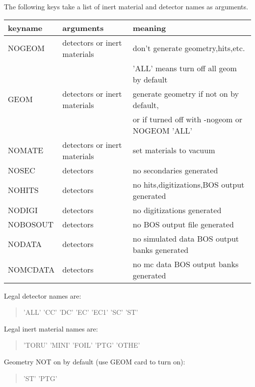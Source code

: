 \documentclass{article}
\begin{document}
\par
\noindent
The following keys take a list of inert material and detector names as arguments.
\par
\begin{center}
\begin{tabular}{|l|l|l|} \hline
keyname   &  arguments                    &  meaning \\ \hline
NOGEOM    &  detectors or inert materials &  don't generate geometry,hits,etc. \\
          &                               &  'ALL' means turn off all geom by default \\ \hline
GEOM      &  detectors or inert materials &  generate geometry if not on by default, \\
          &                               &  or if turned off with -nogeom or NOGEOM 'ALL' \\  \hline
NOMATE    &  detectors or inert materials &  set materials to vacuum \\ \hline
NOSEC     &  detectors                    &  no secondaries generated \\  \hline
NOHITS    &  detectors                    &  no hits,digitizations,BOS output generated \\  \hline
NODIGI    &  detectors                    &  no digitizations generated \\  \hline
NOBOSOUT  &  detectors                    &  no BOS output file generated \\  \hline
NODATA    &  detectors                    &  no simulated data BOS output banks generated \\  \hline
NOMCDATA  &  detectors                    &  no mc data BOS output banks generated \\ \hline
\end{tabular}
\end{center}
\par

\noindent
Legal detector names are:
\begin{quote}
'ALL' 'CC' 'DC' 'EC' 'EC1' 'SC' 'ST'
\end{quote}

\noindent
Legal inert material names are:
\begin{quote}
'TORU' 'MINI' 'FOIL' 'PTG' 'OTHE'
\end{quote}

\noindent
Geometry NOT on by default (use GEOM card to turn on):
\begin{quote}
'ST' 'PTG'
\end{quote}
\end{document}
